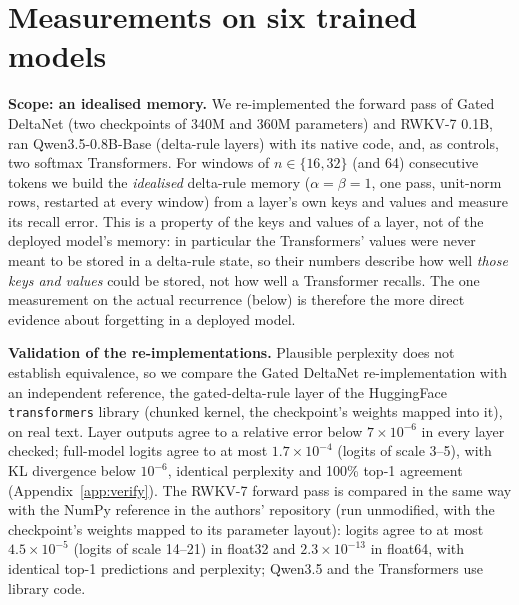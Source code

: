 \documentclass{article}
\begin{document}
\section{Measurements on six trained models}\label{sec:measure}
\textbf{Scope: an idealised memory.} We re-implemented the forward pass of Gated DeltaNet \citep{yang2025gdn} (two checkpoints of 340M and 360M parameters) and RWKV-7 \citep{peng2025rwkv7} 0.1B, ran Qwen3.5-0.8B-Base (delta-rule layers) with its native code, and, as controls, two softmax Transformers. For windows of $n\in\{16,32\}$ (and 64) consecutive tokens we build the \emph{idealised} delta-rule memory ($\alpha=\beta=1$, one pass, unit-norm rows, restarted at every window) from a layer's own keys and values and measure its recall error. This is a property of the keys and values of a layer, not of the deployed model's memory: in particular the Transformers' values were never meant to be stored in a delta-rule state, so their numbers describe how well \emph{those keys and values} could be stored, not how well a Transformer recalls. The one measurement on the actual recurrence (below) is therefore the more direct evidence about forgetting in a deployed model.

\textbf{Validation of the re-implementations.} Plausible perplexity does not establish equivalence, so we compare the Gated DeltaNet re-implementation with an independent reference, the gated-delta-rule layer of the HuggingFace \texttt{transformers} library (chunked kernel, the checkpoint's weights mapped into it), on real text. Layer outputs agree to a relative error below $7\times10^{-6}$ in every layer checked; full-model logits agree to at most $1.7\times10^{-4}$ (logits of scale 3--5), with KL divergence below $10^{-6}$, identical perplexity and 100\% top-1 agreement (Appendix~\ref{app:verify}). The RWKV-7 forward pass is compared in the same way with the NumPy reference in the authors' repository (run unmodified, with the checkpoint's weights mapped to its parameter layout): logits agree to at most $4.5\times10^{-5}$ (logits of scale 14--21) in float32 and $2.3\times10^{-13}$ in float64, with identical top-1 predictions and perplexity; Qwen3.5 and the Transformers use library code.
\end{document}
